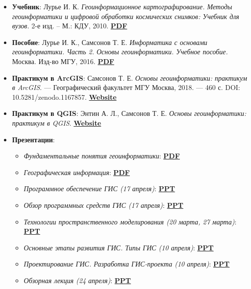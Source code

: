\documentclass[
  12pt,
]{book}
\providecommand{\tightlist}{%
  \setlength{\itemsep}{0pt}\setlength{\parskip}{0pt}}
\begin{document}
\begin{itemize}
\item
  \textbf{Учебник}: Лурье И. К. \emph{Геоинформационное картографирование. Методы геоинформатики и цифровой обработки космических снимков: Учебник для вузов.} 2-е изд. -- М.: КДУ, 2010. \href{https://istina.msu.ru/download/295728157/1jUpeD:roxrGk69x0LxZCpC5w_KNV0o390/}{\textbf{PDF}}
\item
  \textbf{Пособие}: Лурье И. К., Самсонов Т. Е. \emph{Информатика с основами геоинформатики. Часть 2. Основы геоинформатики. Учебное пособие.} Москва. Изд-во МГУ, 2016. \href{https://istina.msu.ru/download/45821659/1ej66u:uSUtcUS-XmdMMyRRpC-yflDmCv8/}{\textbf{PDF}}
\item
  \textbf{Практикум в ArcGIS}: Самсонов Т. Е. \emph{Основы геоинформатики: практикум в ArcGIS}. --- Географический факультет МГУ Москва, 2018. --- 460 с. DOI: 10.5281/zenodo.1167857. \href{https://tsamsonov.github.io/arcgis-course/}{\textbf{Website}}
\item
  \textbf{Практикум в QGIS}: Энтин А. Л., Самсонов Т. Е. \emph{Основы геоинформатики: практикум в QGIS}. \href{https://aentin.github.io/qgis-course/}{\textbf{Website}}
\item
  \textbf{Презентации}:

  \begin{itemize}
  \tightlist
  \item
    \emph{Фундаментальные понятия геоинформатики}: \href{https://www.dropbox.com/s/skfry975yev660o/GIS_Models_Referencing.pdf?dl=0}{\textbf{PDF}}
  \item
    \emph{Географическая информация}: \href{https://www.dropbox.com/s/15x9c5a1zkk34ep/GIS_Information_Economics.pdf?dl=0}{\textbf{PDF}}
  \item
    \emph{Программное обеспечение ГИС (17 апреля)}: \href{https://1drv.ms/p/s!AmtmZDq3JgxHgZYyWa7tCh6cnSncZg?e=4uXt7L}{\textbf{PPT}}
  \item
    \emph{Обзор программных средств ГИС (17 апреля)}: \href{https://1drv.ms/b/s!AmtmZDq3JgxHgZYzXaJpig-PVM3g0A?e=XrTnyu}{\textbf{PPT}}
  \item
    \emph{Технологии пространственного моделирования (20 марта, 27 марта)}: \href{https://1drv.ms/p/s!AmtmZDq3JgxHgZUH2LWFrSxmy9FnEw?e=NGpBCU}{\textbf{PPT}}
  \item
    \emph{Основные этапы развития ГИС. Типы ГИС (10 апреля)}: \href{https://1drv.ms/p/s!AmtmZDq3JgxHgZYTeyK01FEjAt-08w?e=IXMy3D}{\textbf{PPT}}
  \item
    \emph{Проектирование ГИС. Разработка ГИС-проекта (10 апреля)}: \href{https://1drv.ms/p/s!AmtmZDq3JgxHgZYS0k69BhHwrTxFzw?e=VL6xWU}{\textbf{PPT}}
  \item
    \emph{Обзорная лекция (24 апреля)}: \href{https://1drv.ms/p/s!AmtmZDq3JgxHgZY1r1o6Vj4-J7ohlA?e=o6796y}{\textbf{PPT}}
  \end{itemize}
\end{itemize}
\end{document}
